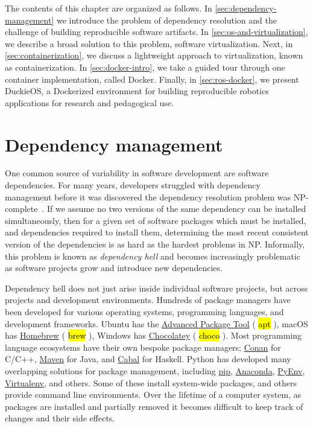 \documentclass[12pt,initial,twoside,maitrise]{dms}
\newcommand{\inline}[1]{%
    \begingroup%
    \sethlcolor{slightgray}%
    \hl{\ttfamily\small #1}%
    \endgroup
}
\numberwithin{equation}{section}
\numberwithin{table}{chapter}
\numberwithin{figure}{chapter}
\begin{document}
The contents of this chapter are organized as follows. In \autoref{sec:dependency-management} we introduce the problem of dependency resolution and the challenge of building reproducible software artifacts. In \autoref{sec:os-and-virtualization}, we describe a broad solution to this problem, software virtualization. Next, in \autoref{sec:containerization}, we discuss a lightweight approach to virtualization, known as containerization. In \autoref{sec:docker-intro}, we take a guided tour through one container implementation, called Docker. Finally, in \autoref{sec:ros-docker}, we present DuckieOS, a Dockerized environment for building reproducible robotics applications for research and pedagogical use.

\section{Dependency management}\label{sec:dependency-management}

One common source of variability in software development are software dependencies. For many years, developers struggled with dependency management before it was discovered the dependency resolution problem was NP-complete~\citep{abate2012dependency}. If we assume no two versions of the same dependency can be installed simultaneously, then for a given set of software packages which must be installed, and dependencies required to install them, determining the most recent consistent version of the dependencies is as hard as the hardest problems in NP. Informally, this problem is known as \textit{dependency hell} and becomes increasingly problematic as software projects grow and introduce new dependencies.

Dependency hell does not just arise inside individual software projects, but across projects and development environments. Hundreds of package managers have been developed for various operating systems, programming languages, and development frameworks. Ubuntu has the \href{https://help.ubuntu.com/lts/serverguide/apt.html}{Advanced Package Tool} (\inline{apt}), macOS has \href{https://brew.sh/}{Homebrew} (\inline{brew}), Windows has \href{https://chocolatey.org/}{Chocolatey} (\inline{choco}). Most programming language ecosystems have their own bespoke package managers; \href{https://conan.io/}{Conan} for C/C++, \href{https://maven.apache.org}{Maven} for Java, and \href{https://www.haskell.org/cabal/}{Cabal} for Haskell. Python has developed many overlapping solutions for package management, including \href{https://pypi.org/project/pip/}{pip}, \href{https://www.anaconda.com/}{Anaconda}, \href{https://github.com/pyenv/pyenv}{PyEnv}, \href{https://virtualenv.pypa.io/}{Virtualenv}, and others. Some of these install system-wide packages, and others provide command line environments. Over the lifetime of a computer system, as packages are installed and partially removed it becomes difficult to keep track of changes and their side effects.
\end{document}
